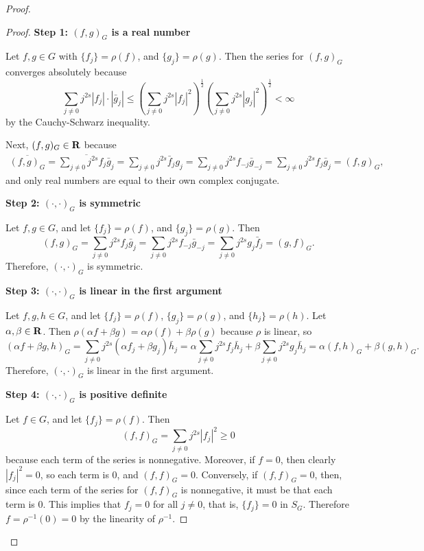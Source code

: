 \documentclass{homework}
\begin{document}
\begin{arabicparts}
\begin{proof}
\begin{proof}
			\textbf{Step 1: $(f,g)_G$ is a real number}
			
			Let $f,g \in G$ with $\{f_j\} = \rho(f)$, and $\{g_j\} = \rho(g)$. Then the series for $(f,g)_G$ converges absolutely because
			\begin{equation}
				\sum_{j\ne 0}j^{2s}|f_j|\cdot|\bar{g}_j| \le \left(\sum_{j\ne0}j^{2s}|f_j|^2\right)^\frac{1}{2}\left(\sum_{j\ne0}j^{2s}|g_j|^2\right)^\frac{1}{2} < \infty
			\end{equation}
			by the Cauchy-Schwarz inequality.
			
			Next, $(f,g)_G \in \textbf{R}$ because
			\begin{align}
				\overline{(f,g)_G} = \overline{\sum_{j\ne0}j^{2s}f_j\bar{g}_j} = \sum_{j\ne0}j^{2s}\bar{f}_jg_j = \sum_{j\ne0}j^{2s}f_{-j}\bar{g}_{-j} = \sum_{j\ne 0}j^{2s}f_j\bar{g}_j = (f,g)_G,
			\end{align}
			and only real numbers are equal to their own complex conjugate.
			
			\textbf{Step 2: $(\cdot,\cdot)_G$ is symmetric}
			
			Let $f,g \in G$, and let $\{f_j\} = \rho(f)$, and $\{g_j\} = \rho(g)$. Then
			\begin{equation}
				(f,g)_G = \sum_{j\ne0}j^{2s}f_j\bar{g}_j = \sum_{j\ne0}j^{2s}f_{-j}\bar{g}_{-j} = \sum_{j\ne0}j^{2s}g_j\bar{f}_j = (g,f)_G.
			\end{equation}
			Therefore, $(\cdot,\cdot)_G$ is symmetric.
			
			\textbf{Step 3: $(\cdot,\cdot)_G$ is linear in the first argument}
			
			Let $f,g,h\in G$, and let $\{f_j\} = \rho(f)$, $\{g_j\} = \rho(g)$, and $\{h_j\} = \rho(h)$. Let $\alpha, \beta \in \textbf{R}$. Then $\rho(\alpha f + \beta g) = \alpha\rho(f) + \beta\rho(g)$ because $\rho$ is linear, so
			\begin{equation}
				(\alpha f + \beta g, h)_G = \sum_{j\ne0}j^{2s}(\alpha f_j + \beta g_j)\bar{h}_j = \alpha\sum_{j\ne0}j^{2s}f_j\bar{h}_j + \beta \sum_{j\ne0}j^{2s}g_j\bar{h}_j = \alpha(f,h)_G + \beta(g,h)_G.
			\end{equation}
			Therefore, $(\cdot,\cdot)_G$ is linear in the first argument.
			
			\textbf{Step 4: $(\cdot,\cdot)_G$ is positive definite}
			
			Let $f \in G$, and let $\{f_j\} = \rho(f)$. Then
			\begin{equation}
				(f,f)_G = \sum_{j\ne 0} j^{2s}|f_j|^2 \ge 0
			\end{equation}
			because each term of the series is nonnegative. Moreover, if $f = 0$, then clearly $|f_j|^2=0$, so each term is 0, and $(f,f)_G = 0$. Conversely, if $(f,f)_G = 0$, then, since each term of the series for $(f,f)_G$ is nonnegative, it must be that each term is 0. This implies that $f_j = 0$ for all $j\ne 0$, that is, $\{f_j\} = 0$ in $S_G$. Therefore $f = \rho^{-1}(0) = 0$ by the linearity of $\rho^{-1}$.
			

\end{proof}
\end{proof}
\end{arabicparts}
\end{document}
